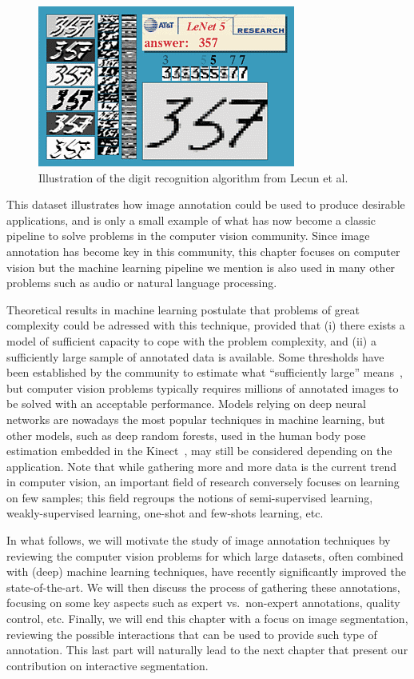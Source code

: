 \begin{figure}[ht]
\centering
\includegraphics[width=0.5\columnwidth]{assets/img/lenet-results.png}
\caption{Illustration of the digit recognition algorithm from Lecun et al.\ \cite{lecun1998gradient}}%
\label{fig:lenet}
\end{figure}

This dataset illustrates how image annotation could be used
to produce desirable applications, and is only a small example of what
has now become a classic pipeline to solve problems in the computer vision community.
Since image annotation has become key in this community,
this chapter focuses on computer vision but
the machine learning pipeline we mention is also used in many other problems
such as audio or natural language processing.

Theoretical results in machine learning postulate that
problems of great complexity could be adressed with this technique,
provided that (i) there exists a model of sufficient capacity
to cope with the problem complexity,
and (ii) a sufficiently large sample of annotated data is available.
Some thresholds have been established by the community to estimate
what ``sufficiently large'' means~\cite{raudys1991small, jain198239},
but computer vision problems typically requires millions
of annotated images to be solved with an acceptable performance.
Models relying on deep neural networks are nowadays
the most popular techniques in machine learning,
but other models, such as deep random forests,
used in the human body pose estimation embedded in the Kinect~\cite{shotton2011real},
may still be considered depending on the application.
Note that while gathering more and more data is the current trend in computer vision,
an important field of research conversely focuses on learning on few samples;
this field regroups the notions of semi-supervised learning,
weakly-supervised learning, one-shot and few-shots learning, etc.

In what follows, we will motivate the study of image annotation techniques
by reviewing the computer vision problems for which large datasets,
often combined with (deep) machine learning techniques,
have recently significantly improved the state-of-the-art.
We will then discuss the process of gathering these annotations,
focusing on some key aspects such as expert vs.\ non-expert annotations, quality control, etc.
Finally, we will end this chapter with a focus on image segmentation, 
reviewing the possible interactions that can be used to provide 
such type of annotation. This last part will naturally lead to the next chapter
that present our contribution on interactive segmentation.

